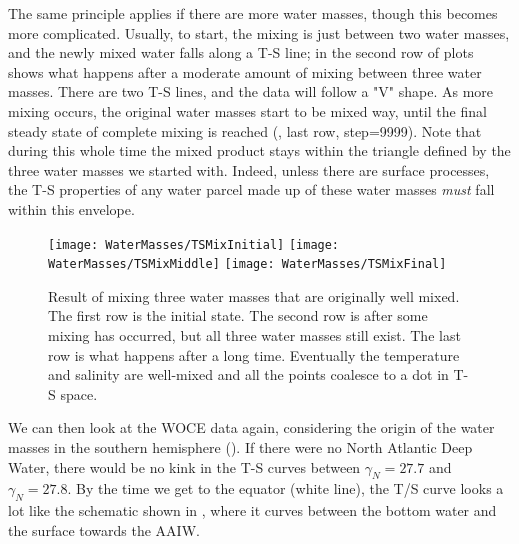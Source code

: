 The same principle applies if there are more water masses, though this becomes more complicated.  Usually, to start, the mixing is just between two water masses, and the newly mixed water falls along a T-S line; in  the second row of plots shows what happens after a moderate amount of mixing between three water masses.  There are two T-S lines, and the data will follow a "V" shape.  As more mixing occurs, the original water masses start to be mixed way, until the final steady state of complete mixing is reached (, last row, step=9999).  Note that during this whole time the mixed product stays within the triangle defined by the three water masses we started with.  Indeed, unless there are surface processes, the T-S properties of any water parcel made up of these water masses \emph{must} fall within this envelope.  

\begin{figure}[htp]
  \centering
  \texttt{[image: WaterMasses/TSMixInitial]}
  \texttt{[image: WaterMasses/TSMixMiddle]}
    \texttt{[image: WaterMasses/TSMixFinal]}
      \caption{Result of mixing three water masses that are originally well mixed.  The first row is the initial state. The second row is after some mixing has occurred, but all three water masses still exist.  The last row is what happens after a long time.  Eventually the temperature and salinity are well-mixed and all the points coalesce to a dot in T-S space. }
    \label{fig:TSMixEvolve}  
\end{figure}

We can then look at the WOCE data again, considering the origin of the water masses in the southern hemisphere ().  If there were no North Atlantic Deep Water, there would be no kink in the T-S curves between $\gamma_N = 27.7$ and $\gamma_N=27.8$.  By the time we get to the equator (white line), the T/S curve looks a lot like the schematic shown in , where it curves between the bottom water and the surface towards the AAIW.  

